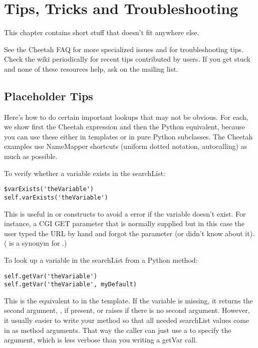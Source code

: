 \section{Tips, Tricks and Troubleshooting}
\label{tips}

This chapter contains short stuff that doesn't fit anywhere else.

See the Cheetah FAQ for more specialized issues and for troubleshooting tips.
Check the wiki periodically for recent tips contributed by users.  If you
get stuck and none of these resources help, ask on the mailing list.

\subsection{Placeholder Tips}
\label{tips.placeholder}

Here's how to do certain important lookups that may not be obvious.
For each, we show first the Cheetah expression and then the Python equivalent,
because you can use these either in templates or in pure Python subclasses.
The Cheetah examples use NameMapper shortcuts (uniform dotted notation, 
autocalling) as much as possible.

To verify whether a variable exists in the searchList:
\begin{verbatim}
$varExists('theVariable')
self.varExists('theVariable')
\end{verbatim}
This is useful in  or  constructs to avoid a
 error if the variable doesn't exist.  For instance,
a CGI GET parameter that is normally supplied but in this case the user typed
the URL by hand and forgot the parameter (or didn't know about it).
( is a synonym for .)

To look up a variable in the searchList from a Python method:
\begin{verbatim}
self.getVar('theVariable')
self.getVar('theVariable', myDefault)
\end{verbatim}
This is the equivalent to  in the template.  If the 
variable is missing, it returns the second argument, , if 
present, or raises  if there is no second argument.
However, it usually easier to write your method so that all needed searchList
values come in as method arguments.  That way the caller can just use a
 to specify the argument, which is less verbose than you
writing a getVar call.

